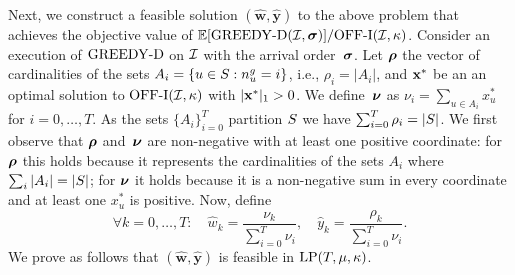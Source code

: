 Next, we construct a feasible solution $(\mathbf{\hat{w}}, \mathbf{\hat{y}})$ to the above problem that achieves the objective value of $\mathbb E[\mathrm{GREEDY\textrm{-}D}(\mathcal I, \bm{\sigma})]/\mathrm{\mathrm{OFF}}\textrm{-}\mathrm{I}(\mathcal I,\kappa)$.
Consider an execution of $\mathrm{GREEDY\textrm{-}D}$ on $\mathcal I$ with the arrival order~$\bm{\sigma}$. Let $\bm{\rho}$ the vector of cardinalities of the sets $A_i = \left\{ u \in S:  n_u^g = i \right\}$, i.e., $\rho_i=|A_i|$, and $\mathbf{x}^*$ be an an optimal solution to $\mathrm{\mathrm{OFF}}\textrm{-}\mathrm{I}(\mathcal I,\kappa)$ with $|\mathbf{x}^*|_1>0$. We define~$\bm{\nu}$ as $\nu_i = \sum_{u \in A_i} x_{u}^*$ for $i = 0, \ldots, T$. As the sets $\{A_i\}_{i=0}^T$ partition $S$ we have $\sum_{i=0}^T \rho_i = |S|$. We first observe that $\bm{\rho}$ and~$\bm{\nu}$ are non-negative with at least one positive coordinate: for $\bm{\rho}$ this holds because  it represents the cardinalities of the sets $A_i$ where $\sum_i |A_i|=|S|$; for $\bm{\nu}$ it holds because it is a non-negative sum in every coordinate and at least one $x_u^*$ is positive. Now, define 
    \begin{equation*}
         \forall k = 0, \ldots, T: \quad  \hat{w}_k = \frac{\nu_k}{\sum_{i=0}^T \nu_i},\quad \hat{y}_k = \frac{\rho_k}{\sum_{i=0}^T \nu_i}.
    \end{equation*}
    We prove as follows that $(\mathbf{\hat{w}}, \mathbf{\hat{y}})$ is feasible in $\mathrm{LP}(T,\mu, \kappa)$. %
